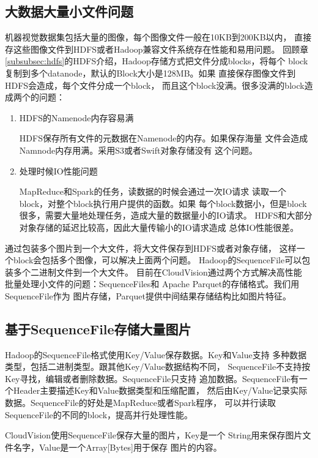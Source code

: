 \subsection{大数据大量小文件问题}
\label{subsec:big-data-small-files}
机器视觉数据集包括大量的图像，每个图像文件一般在10KB到200KB以内，
直接存这些图像文件到HDFS或者Hadoop兼容文件系统存在性能和易用问题。
回顾章\ref{subsubsec:hdfs}的HDFS介绍，Hadoop存储方式把文件分成blocks，将每个
block复制到多个datanode，默认的Block大小是128MB。如果
直接保存图像文件到HDFS会造成，每个文件分成一个block，
而且这个block没满。很多没满的block造成两个的问题：
\begin{enumerate}
  \item HDFS的Namenode内存容易满

        HDFS保存所有文件的元数据在Namenode的内存。如果保存海量
        文件会造成Namnode内存用满。采用S3或者Swift对象存储没有
        这个问题。

  \item 处理时候IO性能问题
        
        MapReduce和Spark的任务，读数据的时候会通过一次IO请求
        读取一个block，对整个block执行用户提供的函数。如果
        每个block数据小，但是block很多，需要大量地处理任务，造成大量的数据量小的IO请求。
        HDFS和大部分对象存储的延迟比较高，因此大量传输小的IO请求造成
        总体IO性能很差。
\end{enumerate}


通过包装多个图片到一个大文件，将大文件保存到HDFS或者对象存储，
这样一个block会包括多个图像，可以解决上面两个问题。
Hadoop的SequenceFile可以包装多个二进制文件到一个大文件。
目前在CloudVision通过两个方式解决高性能
批量处理小文件的问题：SequenceFiles和
Apache Parquet的存储格式。我们用SequenceFile作为
图片存储，Parquet提供中间结果存储结构比如图片特征。


\subsection{基于SequenceFile存储大量图片}
\label{subsec:seq-file}
Hadoop的SequenceFile格式使用Key/Value保存数据。Key和Value支持
多种数据类型，包括二进制类型。跟其他Key/Value数据结构不同，
SequenceFile不支持按Key寻找，编辑或者删除数据。SequenceFile只支持
追加数据。SequenceFile有一个Header主要描述Key和Value数据类型和压缩配置，
然后由Key/Value记录实际数据。SequenceFile的好处是MapReduce或者Spark程序，
可以并行读取SequenceFile的不同的block，提高并行处理性能。

CloudVision使用SequenceFile保存大量的图片，Key是一个
String用来保存图片文件名字，Value是一个Array[Bytes]用于保存
图片的内容。

